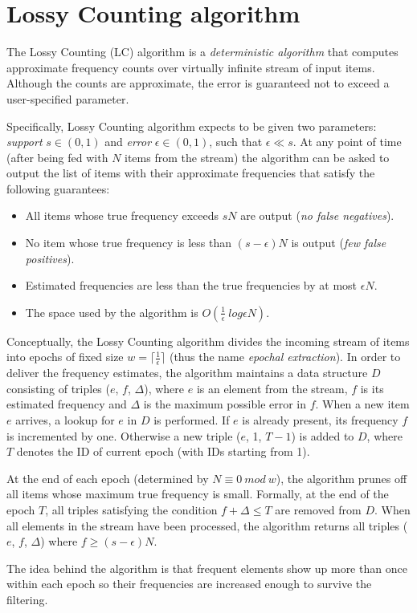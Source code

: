 \chapter{Lossy Counting algorithm}
\label{chap:lossy-counting}

The Lossy Counting (LC) algorithm \citep{manku:lossycounting} is a \emph{deterministic algorithm}
that computes approximate frequency counts over virtually infinite stream of input items.
Although the counts are approximate, the error is guaranteed not to exceed a user-specified parameter.

Specifically, Lossy Counting algorithm expects to be given two parameters:
\emph{support} $s \in (0,1)$ and \emph{error} $\epsilon \in (0,1)$, such that $\epsilon \ll s$.
At any point of time (after being fed with $N$ items from the stream) the algorithm can be
asked to output the list of items with their approximate frequencies that satisfy the following guarantees:
\begin{itemize}
 \item All items whose true frequency exceeds $sN$ are output (\emph{no false negatives}).
 \item No item whose true frequency is less than $(s - \epsilon)N$ is output (\emph{few false positives}).
 \item Estimated frequencies are less than the true frequencies by at most $\epsilon N$.
 \item The space used by the algorithm is $O(\frac{1}{\epsilon}~log \epsilon N)$.
\end{itemize}


Conceptually, the Lossy Counting algorithm divides the incoming stream of items
into epochs of fixed size $w = \lceil \frac{1}{\epsilon} \rceil$
(thus the name \emph{epochal extraction}).
In order to deliver the frequency estimates, the algorithm maintains a data structure $D$
consisting of triples ($e$, $f$, $\Delta$), where $e$ is an element from the
stream, $f$ is its estimated frequency and $\Delta$ is the maximum possible
error in $f$. When a new item $e$ arrives, a lookup for $e$ in $D$ is
performed. If $e$ is already present, its frequency $f$ is incremented by one.
Otherwise a new triple ($e$, 1, $T-1$) is added to $D$, where $T$ denotes the
ID of current epoch (with IDs starting from 1).

At the end of each epoch (determined by $N \equiv 0~mod~w$), the algorithm
prunes off all items whose maximum true frequency is small. Formally, at the end
of the epoch $T$, all triples satisfying the condition $f + \Delta \leqslant T$ are
removed from $D$. When all elements in the stream have been processed, the
algorithm returns all triples ($e$, $f$, $\Delta$) where $f \geq
(s-\epsilon)N$.

The idea behind the algorithm is that frequent elements show up more than once
within each epoch so their frequencies are increased enough to survive the
filtering.
